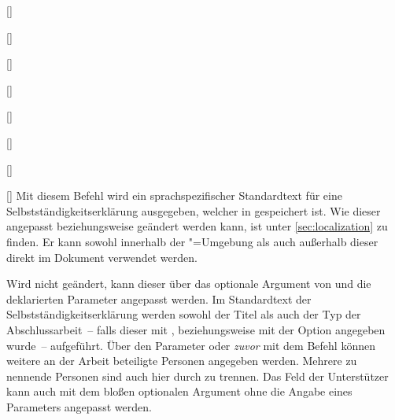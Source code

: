 \begin{Declaration*}{}
\begin{Declaration*}{}
\begin{Declaration*}{}
\begin{Declaration}{}
\begin{Declaration}{[]}
\begin{Declaration}{[]}
\begin{Declaration}{[]}
\begin{Declaration}{[]}
\begin{Declaration}[v2.02]{%
  []%
}
\begin{Declaration}[v2.02]{%
  []%
}
\begin{Declaration}[v2.02]{%
  []%
}
\begin{Declaration}{[\PSet]}
\printdeclarationlist%
%
%
Mit diesem Befehl wird ein sprachspezifischer Standardtext für eine 
Selbstständigkeitserklärung ausgegeben, welcher in  
gespeichert ist. Wie dieser angepasst beziehungsweise geändert werden kann, ist 
unter \autoref{sec:localization} zu finden. Er kann sowohl innerhalb der 
"=Umgebung als auch außerhalb dieser direkt im 
Dokument verwendet werden. 

Wird  nicht geändert, kann dieser über das optionale 
Argument von  und die deklarierten Parameter angepasst 
werden. Im Standardtext der Selbstständigkeitserklärung werden sowohl der Titel 
als auch der Typ der Abschlussarbeit~-- falls dieser mit , 
 beziehungsweise mit der Option 
 angegeben wurde~-- aufgeführt. Über den Parameter 
 oder \emph{zuvor} mit dem Befehl 
 können weitere an der Arbeit beteiligte Personen angegeben 
werden. Mehrere zu nennende Personen sind auch hier durch  zu 
trennen. Das Feld der Unterstützer kann auch mit dem bloßen optionalen Argument 
ohne die Angabe eines Parameters angepasst werden.


\end{Declaration}
\end{Declaration}
\end{Declaration}
\end{Declaration}
\end{Declaration}
\end{Declaration}
\end{Declaration}
\end{Declaration}
\end{Declaration}
\end{Declaration*}
\end{Declaration*}
\end{Declaration*}
